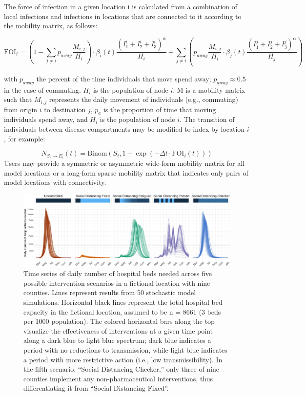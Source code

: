 {The force of infection in a given location i is calculated from a combination of local infections and infections in locations that are connected to it according to the mobility matrix, as follows:
\begin{fullwidth}
\begin{equation}
\text{FOI}_i = \left(1 - \sum_{j\neq i} p_{away} \frac{M_{i,j}}{H_i} \right) \cdot \beta_i(t) \frac{(I_1^{i} + I_2^{i} + I_3^{i})^\alpha}{H_i} +  \sum_{j \neq i} \left(p_{away} \frac{M_{i,j}}{H_i} \cdot \beta_j(t) \frac{(I_1^j + I_2^j + I_3^j)^\alpha}{H_j} \right)
\end{equation}
\end{fullwidth}

with $p_{away}$ the percent of the time individuals that move spend away; $p_{away} \approx 0.5$ in the case of commuting. $H_i$ is the population of node $i$. M is a mobility matrix such that $M_{i,j}$ represents the daily movement of individuals (e.g., commuting) from origin $i$ to destination $j$, $p_a$ is the proportion of time that moving individuals spend away, and $H_i$ is the population of node $i$. The transition of individuals between disease compartments may be modified to index by location $i$, for example:

\begin{equation}
N_{S_i \to E_i} (t) = \text{Binom}\left(S_i ,1 - \exp \left(- \Delta t \cdot\text{FOI}_{i}(t) \right) \right)
\end{equation}
Users may provide a symmetric or asymmetric wide-form mobility matrix for all model locations or a long-form sparse mobility matrix that indicates only pairs of model locations with connectivity.
\begin{figure}[!htb]%
    \centering
    \includegraphics{fig_pipeline/fig2a}
    \caption[Time series of daily number of hospital beds needed across scenarios.]{Time series of daily number of hospital beds needed across five possible intervention scenarios in a fictional location with nine counties. Lines represent results from 50 stochastic model simulations. Horizontal black lines represent the total hospital bed capacity in the fictional location, assumed to be n = 8661 (3 beds per 1000 population). The colored horizontal bars along the top visualize the effectiveness of interventions at a given time point along a dark blue to light blue spectrum; dark blue indicates a period with no reductions to transmission, while light blue indicates a period with more restrictive action (i.e., low transmissibility). In the fifth scenario, “Social Distancing Checker,” only three of nine counties implement any non-pharmaceutical interventions, thus differentiating it from “Social Distancing Fixed”.}
    \label{fig:pipeline-seir}
\end{figure}


}
